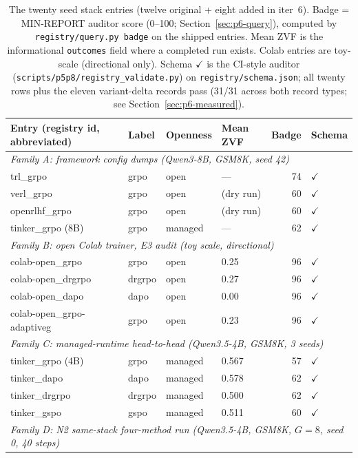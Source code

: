 \documentclass{article}
\begin{document}
\begin{table}[t]
\centering
\caption{The twenty seed stack entries (twelve original + eight added in iter~6).
Badge = MIN-REPORT auditor score (0--100; Section~\ref{sec:p6-query}), computed by
\texttt{registry/query.py badge} on the shipped entries. Mean ZVF is the
informational \texttt{outcomes} field where a completed run exists. Colab
entries are toy-scale (directional only). Schema $\checkmark$ is the
CI-style auditor (\texttt{scripts/p5p8/registry\_validate.py}) on
\texttt{registry/schema.json}; all twenty rows plus the eleven variant-delta
records pass (31/31 across both record types; see Section~\ref{sec:p6-measured}).}
\label{tab:p6-entries}
\small
\begin{tabular}{llllrl}
\toprule
Entry (registry id, abbreviated) & Label & Openness & Mean ZVF & Badge & Schema \\
\midrule
\multicolumn{6}{l}{\emph{Family A: framework config dumps (Qwen3-8B, GSM8K, seed 42)}}\\
trl_grpo & grpo & open & --- & 74 & $\checkmark$ \\
verl_grpo & grpo & open & (dry run) & 60 & $\checkmark$ \\
openrlhf_grpo & grpo & open & (dry run) & 60 & $\checkmark$ \\
tinker_grpo (8B) & grpo & managed & --- & 62 & $\checkmark$ \\
\midrule
\multicolumn{6}{l}{\emph{Family B: open Colab trainer, E3 audit (toy scale, directional)}}\\
colab-open_grpo & grpo & open & 0.25 & 96 & $\checkmark$ \\
colab-open_drgrpo & drgrpo & open & 0.27 & 96 & $\checkmark$ \\
colab-open_dapo & dapo & open & 0.00 & 96 & $\checkmark$ \\
colab-open_grpo-adaptiveg & grpo & open & 0.23 & 96 & $\checkmark$ \\
\midrule
\multicolumn{6}{l}{\emph{Family C: managed-runtime head-to-head (Qwen3.5-4B, GSM8K, 3 seeds)}}\\
tinker_grpo (4B) & grpo & managed & 0.567 & 57 & $\checkmark$ \\
tinker_dapo & dapo & managed & 0.578 & 62 & $\checkmark$ \\
tinker_drgrpo & drgrpo & managed & 0.500 & 62 & $\checkmark$ \\
tinker_gspo & gspo & managed & 0.511 & 60 & $\checkmark$ \\
\midrule
\multicolumn{6}{l}{\emph{Family D: N2 same-stack four-method run (Qwen3.5-4B, GSM8K, $G{=}8$, seed 0, 40 steps)}}\\

\end{tabular}
\end{table}
\end{document}
